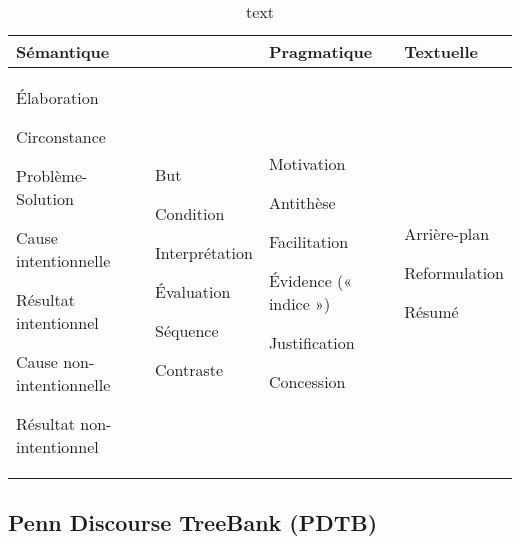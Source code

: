 \documentclass{KodeBook}
\begin{document}
\begin{table}[ht]
	\centering\small
\begin{tabular}{p{}p{}p{}p{}}
	\hline\hline
	\textbf{Sémantique} && \textbf{Pragmatique} & \textbf{Textuelle} \\
	\hline
	
	Élaboration
	
	Circonstance
	
	Problème-Solution
	
	Cause intentionnelle
	
	Résultat intentionnel
	
	Cause non-intentionnelle
	
	Résultat non-intentionnel
	&
	But
	
	Condition
	
	Interprétation
	
	Évaluation
	
	Séquence
	
	Contraste
	
	&
	
	Motivation
	
	Antithèse
	
	Facilitation
	
	Évidence (« indice »)
	
	Justification
	
	Concession
	
	&
	
	Arrière-plan
	
	Reformulation
	
	Résumé\\
	\hline\hline
\end{tabular}
\caption{text}
\label{tab:rst-niveau}
\end{table}

\subsection{Penn Discourse TreeBank (PDTB)}
\end{document}
